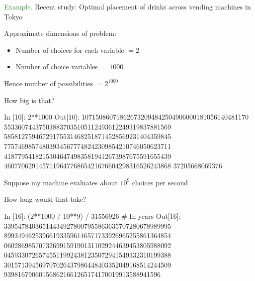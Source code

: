 \documentclass[
    xcolor={svgnames,dvipsnames},
    hyperref={colorlinks, citecolor=DeepPink4, linkcolor=DarkRed, urlcolor=DarkBlue}
    ]{beamer}  %
\newcommand{\Eg}{\textcolor{ForestGreen}{Example. }}
\newcommand{\1}{\mathbbm 1}
\begin{document}
\begin{frame}
    
    \Eg Recent study: Optimal placement of drinks across vending machines in
    Tokyo

        \vspace{0.5em}
        \vspace{0.5em}
    Approximate dimensions of problem:

    \begin{itemize}
        \item Number of choices for each variable $=2$
        \vspace{0.5em}
        \item Number of choice variables $=1000$
    \end{itemize}

        \vspace{0.5em}
        \vspace{0.5em}
    Hence number of possibilities $=2^{1000}$

    \vspace{1em}

    How big is that?

\end{frame}

\begin{frame}[fragile]
    
\begin{pythoncode}
In [10]: 2**1000
Out[10]:
107150860718626732094842504906000181056140481170
553360744375038837035105112493612249319837881569
585812759467291755314682518714528569231404359845
775746985748039345677748242309854210746050623711
418779541821530464749835819412673987675591655439
460770629145711964776865421676604298316526243868
37205668069376
\end{pythoncode}

\end{frame}


\begin{frame}[fragile]

    Suppose my machine evaluates about $10^9$ choices per second

        \vspace{0.5em}
        \vspace{0.5em}
        \vspace{0.5em}
    How long would that take?

\end{frame}


\begin{frame}[fragile]


\begin{pythoncode}
In [16]: (2**1000 / 10**9) / 31556926  # In years
Out[16]:
339547840365144349278007955863635707280678989995
899349462539661933596146571733926965255861364854
060286985707326991591901311029244639453805988092
045933072657455119924381235072941549332310199388
301571394569707026437986448403352049168514244509
939816790601568621661265174170019913588941596
\end{pythoncode}

\end{frame}
\end{document}
